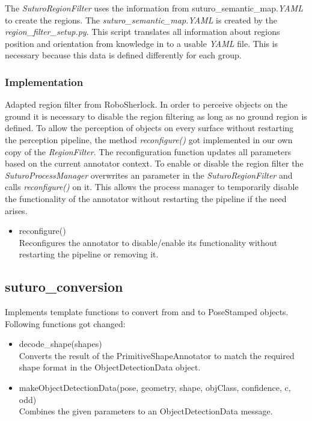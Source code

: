 \documentclass[main.tex]{subfiles}
\begin{document}
The \textit{SuturoRegionFilter} uses the information from suturo\_semantic\_map.\textit{YAML} to create the regions. 
The \textit{suturo\_semantic\_map.\textit{YAML}} is created by the \textit{region\_filter\_setup.py}. 
This script translates all information about regions position and orientation from knowledge in to a usable \textit{YAML} file. 
This is necessary because this data is defined differently for each group.

\subsubsection{Implementation}
Adapted region filter from RoboSherlock. In order to perceive objects on the ground it is necessary to disable
the region filtering as long as no ground region is defined. To allow the perception of objects on every surface
without restarting the perception pipeline, the method \textit{reconfigure()} got implemented in our own copy of the 
\textit{RegionFilter}. The reconfiguration function updates all parameters based on the current annotator context.
To enable or disable the region filter the \textit{SuturoProcessManager} overwrites an parameter in the \textit{SuturoRegionFilter}
and calls \textit{reconfigure()} on it. 
This allows the process manager to temporarily disable the functionality of the annotator without restarting the pipeline if the need arises.

\begin{itemize}
\item reconfigure()\\
Reconfigures the annotator to disable/enable its functionality without restarting the pipeline or removing it.
\end{itemize}

\subsection{suturo\_conversion}
Implements template functions to convert from and to PoseStamped objects.
Following functions got changed:

\begin{itemize}
\item decode\_shape(shapes)\\
Converts the result of the PrimitiveShapeAnnotator to match the required shape format in the ObjectDetectionData object.

\item makeObjectDetectionData(pose, geometry, shape, objClass, confidence, c, odd)\\
Combines the given parameters to an ObjectDetectionData message.
\end{itemize}
\end{document}
